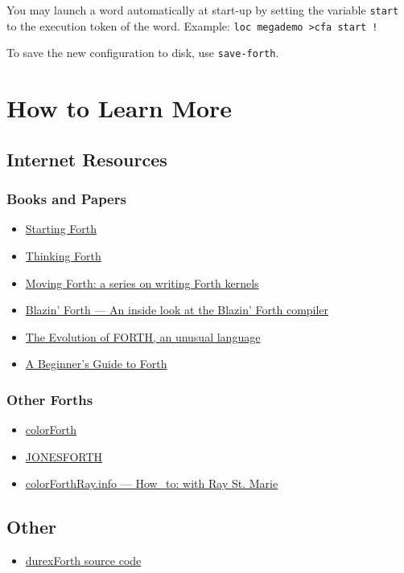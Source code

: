 You may launch a word automatically at start-up by setting the variable \texttt{start} to the execution token of the word.  Example: \texttt{loc megademo >cfa start !}

To save the new configuration to disk, use \texttt{save-forth}.

\section{How to Learn More}

\subsection{Internet Resources}

\subsubsection{Books and Papers}

\begin{itemize}
\item \href{http://www.forth.com/starting-forth/}{Starting Forth}
\item \href{http://thinking-forth.sourceforge.net/}{Thinking Forth}
\item \href{http://www.bradrodriguez.com/papers/}{Moving Forth: a series on writing Forth kernels}
\item \href{http://www.csbruce.com/~csbruce/cbm/transactor/v7/i5/p058.html}{Blazin' Forth --- An inside look at the Blazin' Forth compiler}
\item \href{http://dobbscodetalk.com/index.php?option=com_myblog&show=In-this-1980-article-from-Byte-Charles-Moore-recounts-the-creation-of-Forth..html&Itemid=29}{The Evolution of FORTH, an unusual language}
\item \href{http://galileo.phys.virginia.edu/classes/551.jvn.fall01/primer.htm}{A Beginner's Guide to Forth}
\end{itemize}

\subsubsection{Other Forths}

\begin{itemize}
\item \href{http://www.colorforth.com/cf.html}{colorForth}
\item \href{http://www.annexia.org/forth}{JONESFORTH}
\item \href{http://colorforthray.info/}{colorForthRay.info --- How\_to: with Ray St. Marie}
\end{itemize}

\subsection{Other}

\begin{itemize}
\item \href{http://code.google.com/p/durexforth/}{durexForth source code}
\end{itemize}
